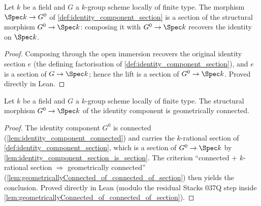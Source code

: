 \begin{lemma}

  \label{lem:identity_component_section_is_section}
  Let \(k\) be a field and \(G\) a \(k\)-group scheme locally of finite
  type. The morphism \(\Spec k \to G^0\) of
  \cref{def:identity_component_section} is a section of the structural
  morphism \(G^0 \to \Spec k\): composing it with \(G^0 \to \Spec k\)
  recovers the identity on \(\Spec k\).
\end{lemma}
\begin{proof}
  Composing through the open immersion recovers the original identity
  section \(e\) (the defining factorisation of
  \cref{def:identity_component_section}), and \(e\) is a section of
  \(G \to \Spec k\); hence the lift is a section of \(G^0 \to \Spec k\).
  Proved directly in Lean.
\end{proof}

\begin{lemma}

  \label{lem:identity_component_geometrically_connected}
  Let \(k\) be a field and \(G\) a \(k\)-group scheme locally of finite
  type. The structural morphism \(G^0 \to \Spec k\) of the identity
  component is geometrically connected.
\end{lemma}
\begin{proof}
  The identity component \(G^0\) is connected
  (\cref{lem:identity_component_connected}) and carries the \(k\)-rational
  section of \cref{def:identity_component_section}, which is a section of
  \(G^0 \to \Spec k\) by \cref{lem:identity_component_section_is_section}.
  The criterion ``connected \(+\) \(k\)-rational section \(\Rightarrow\)
  geometrically connected''
  (\cref{lem:geometricallyConnected_of_connected_of_section}) then yields
  the conclusion. Proved directly in Lean (modulo the residual Stacks 037Q
  step inside \cref{lem:geometricallyConnected_of_connected_of_section}).
\end{proof}

